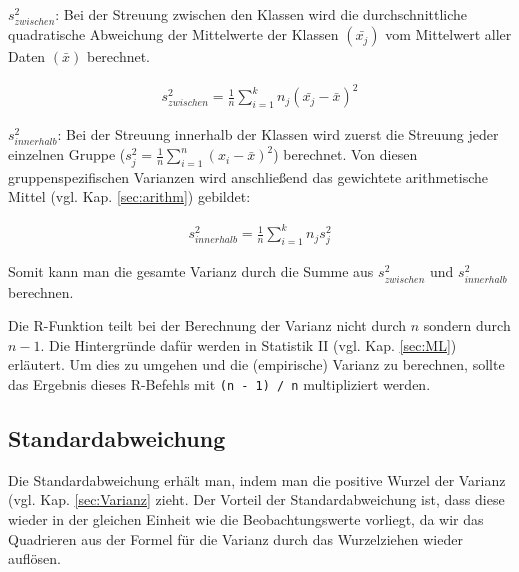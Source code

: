 \documentclass[a4paper]{article}
\newcommand\dangersign[1][2ex]{%
  \renewcommand\stacktype{L}%
  \scaleto{\stackon[1.3pt]{\color{red}$\triangle$}{\tiny !}}{#1}%
}
\begin{document}
\noindent $s^2_{zwischen}$: Bei der Streuung zwischen den Klassen wird die durchschnittliche quadratische Abweichung der Mittelwerte der Klassen $(\bar{x_j})$ vom Mittelwert aller Daten $(\bar{x})$ berechnet.

\begin{align*}
    s^2_{zwischen} = \frac{1}{n} \sum_{i=1}^k n_j (\bar{x_j}-\bar{x})^2
\end{align*}

\noindent $s^2_{innerhalb}$: Bei der Streuung innerhalb der Klassen wird zuerst die Streuung jeder einzelnen Gruppe ($s^2_j=\frac{1}{n} \sum_{i=1}^n (x_i-\bar{x})^2$) berechnet. Von diesen gruppenspezifischen Varianzen wird anschließend das gewichtete arithmetische Mittel (vgl. Kap. \ref{sec:arithm}) gebildet:

\begin{align*}
    s^2_{innerhalb} = \frac{1}{n} \sum_{i=1}^k n_j s^2_j
\end{align*}

\noindent Somit kann man die gesamte Varianz durch die Summe aus $s^2_{zwischen}$ und $s^2_{innerhalb}$ berechnen.\\

\noindent {}

\noindent \dangersign[3ex] Die R-Funktion teilt bei der Berechnung der Varianz nicht durch $n$ sondern durch $n-1$. Die Hintergründe dafür werden in Statistik II (vgl. Kap. \ref{sec:ML}) erläutert. Um dies zu umgehen und die (empirische) Varianz zu berechnen, sollte das Ergebnis dieses R-Befehls mit \texttt{(n - 1) / n} multipliziert werden.

\subsection{Standardabweichung}
Die Standardabweichung erhält man, indem man die positive Wurzel der Varianz (vgl. Kap. \ref{sec:Varianz} zieht. Der Vorteil der Standardabweichung ist, dass diese wieder in der gleichen Einheit wie die Beobachtungswerte vorliegt, da wir das Quadrieren aus der Formel für die Varianz durch das Wurzelziehen wieder auflösen.\\

\noindent {}
\end{document}
